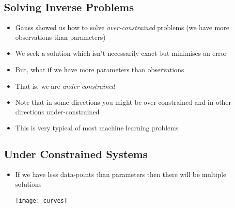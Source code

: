 \begin{slide}
\section{Solving Inverse Problems}

\begin{PauseHighLight}
  \begin{itemize}
  \item Gauss showed us how to solve \emph{over-constrained} problems
    (we have more observations than parameters)\pause
  \item We seek a solution which isn't necessarily exact but minimises
    an error\pause
  \item But, what if we have more parameters than observations\pause
  \item That is, we are \emph{under-constrained}\pause
  \item Note that in some directions you might be over-constrained and
    in other directions under-constrained\pause
  \item This is very typical of most machine learning problems\pauseb
  \end{itemize}
\end{PauseHighLight}

\end{slide}


\begin{slide}
\section[-2]{Under Constrained Systems}

\begin{PauseHighLight}
  \begin{itemize}
  \item If we have less data-points than parameters then there will be
    multiple solutions
  \begin{center}
    \texttt{[image: curves]}\pause
  \end{center}
  \end{itemize}
\end{PauseHighLight}

\end{slide}



